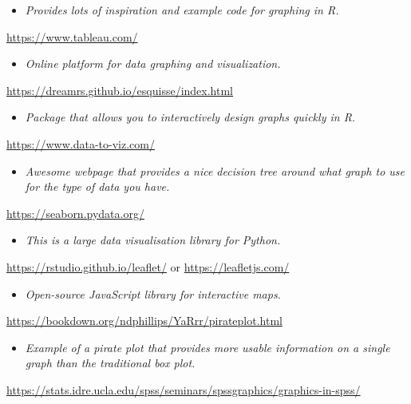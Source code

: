 \documentclass[
]{book}
\providecommand{\tightlist}{%
  \setlength{\itemsep}{0pt}\setlength{\parskip}{0pt}}
\begin{document}
\begin{itemize}
\tightlist
\item
  \emph{Provides lots of inspiration and example code for graphing in R.}
\end{itemize}

\url{https://www.tableau.com/}

\begin{itemize}
\tightlist
\item
  \emph{Online platform for data graphing and visualization.}
\end{itemize}

\url{https://dreamrs.github.io/esquisse/index.html}

\begin{itemize}
\tightlist
\item
  \emph{Package that allows you to interactively design graphs quickly in R.}
\end{itemize}

\url{https://www.data-to-viz.com/}

\begin{itemize}
\tightlist
\item
  \emph{Awesome webpage that provides a nice decision tree around what graph to use for the type of data you have.}
\end{itemize}

\url{https://seaborn.pydata.org/}

\begin{itemize}
\tightlist
\item
  \emph{This is a large data visualisation library for Python.}
\end{itemize}

\url{https://rstudio.github.io/leaflet/} or \url{https://leafletjs.com/}

\begin{itemize}
\tightlist
\item
  \emph{Open-source JavaScript library for interactive maps.}
\end{itemize}

\url{https://bookdown.org/ndphillips/YaRrr/pirateplot.html}

\begin{itemize}
\tightlist
\item
  \emph{Example of a pirate plot that provides more usable information on a single graph than the traditional box plot.}
\end{itemize}

\url{https://stats.idre.ucla.edu/spss/seminars/spssgraphics/graphics-in-spss/}
\end{document}
